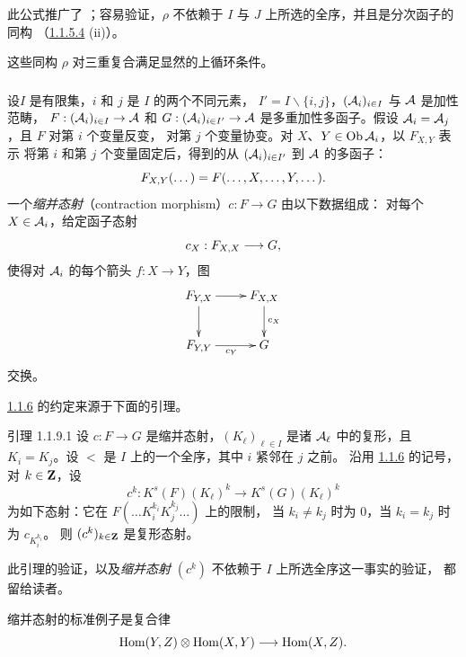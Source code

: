 此公式推广了 ；容易验证，$\rho$ 不依赖于
$I$ 与 $J$ 上所选的全序，并且是分次函子的同构
（\cf \hyperref[XVII.lem1.1.5.4]{1.1.5.4} (ii)）。

这些同构 $\rho$ 对三重复合满足显然的上循环条件。

\subsubsection{}
设\pageoriginale $I$ 是有限集，$i$ 和 $j$ 是 $I$ 的两个不同元素，
$I'=I\backslash\{i,j\}$，$({\mathcal A}_i)_{i\in I}$ 与 ${\mathcal A}$ 是加性范畴，
$F:({\mathcal A}_i)_{i\in I}\rightarrow {\mathcal A}$ 和 $G:({\mathcal A}_i)_{i\in I'}\rightarrow {\mathcal A}$
是多重加性多函子。假设 ${\mathcal A}_i={\mathcal A}_j$，且 $F$ 对第 $i$ 个变量反变，
对第 $j$ 个变量协变。对 $X$、$Y\in \operatorname{Ob} {\mathcal A}_i$，以 $F_{X,Y}$ 表示
将第 $i$ 和第 $j$ 个变量固定后，得到的从 $({\mathcal A}_i)_{i\in I'}$ 到 ${\mathcal A}$ 的多函子：
\[
F_{X,Y}(\dots)=F(\dots, X,\dots,Y,\dots){}.
\]
一个\emph{缩并态射}（contraction morphism）$c:F\rightarrow G$ 由以下数据组成：
对每个 $X\in {\mathcal A}_i$，给定函子态射
\[
c_{X}:F_{X,X}\longrightarrow G{},
\]
使得对 ${\mathcal A}_i$ 的每个箭头 $f:X\rightarrow Y$，图
\[
\xymatrix{
F_{Y,X} \ar[d] \ar[r] & F_{X,X} \ar[d]^{c_X}\\
F_{Y,Y}  \ar[r]_{c_Y}     & G
}
\]
交换。

\hyperref[XVII.subsubsec1.1.6]{1.1.6} 的约定来源于下面的引理。

\begin{enonce*}{引理 1.1.9.1}
设 $c:F\rightarrow G$ 是缩并态射，$(K_{\ell})_{\ell \in I}$ 是诸 ${\mathcal A}_{\ell}$
中的复形，且 $K_{i}=K_{j}$。设 $<$ 是 $I$ 上的一个全序，其中 $i$ 紧邻在 $j$ 之前。
沿用 \hyperref[XVII.subsubsec1.1.6]{1.1.6} 的记号，对 $k\in \mathbf{Z}$，设
\[
c^{k}:K^{s}(F)(K_{\ell})^{k}\longrightarrow K^{s}(G)(K_{\ell})^{k}
\]
为\pageoriginale 如下态射：它在 $F(\ldots K_{i}^{k_i}K_{j}^{k_j}\ldots)$ 上的限制，
当 $k_i\neq k_j$ 时为 $0$，当 $k_{i}=k_{j}$ 时为 $c_{K_i^{k_i}}$。
则 $(c^{k})_{k\in \mathbf{Z}}$ 是复形态射。
\end{enonce*}

此引理的验证，以及\emph{缩并态射} $(c^{k})$ 不依赖于 $I$ 上所选全序这一事实的验证，
都留给读者。

缩并态射的标准例子是复合律
\[
\operatorname{Hom}(Y,Z)\otimes \operatorname{Hom}(X,Y)\longrightarrow \operatorname{Hom}(X,Z).
\]

